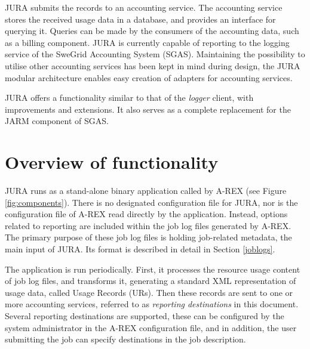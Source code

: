 \documentclass{article}                            %
\begin{document}
JURA submits the records to an accounting service.  The accounting
service stores the received usage data in a database, and provides an
interface for querying it. Queries can be made by the consumers of the
accounting data, such as a billing component. JURA is currently
capable of reporting to the logging service of the SweGrid Accounting
System (SGAS)\cite{sgas}. Maintaining the possibility to utilise other
accounting services has been kept in mind during design, the JURA
modular architecture enables easy creation of adapters for accounting
services.

JURA offers a functionality similar to that of the
\textit{logger}\cite{logger} client, with improvements and extensions.
It also serves as a complete replacement for the JARM component of
SGAS.

\section{Overview of functionality}

\begin{figure}[ht]
\end{figure}

JURA runs as a stand-alone binary application called by A-REX (see
Figure \ref{fig:components}). There is no designated configuration
file for JURA, nor is the configuration file of A-REX read directly by
the application. Instead, options related to reporting are included
within the job log files generated by A-REX. The primary purpose of
these job log files is holding job-related metadata, the main input of
JURA. Its format is described in detail in Section \ref{joblogs}.

The application is run periodically. First, it processes the resource
usage content of job log files, and transforms it, generating a
standard XML representation of usage data, called Usage Records
(URs)\cite{ur}. Then these records are sent to one or more accounting
services, referred to as \textit{reporting destinations} in this
document. Several reporting destinations are supported, these can be
configured by the system administrator in the A-REX configuration
file, and in addition, the user submitting the job can specify
destinations in the job description.
\end{document}
